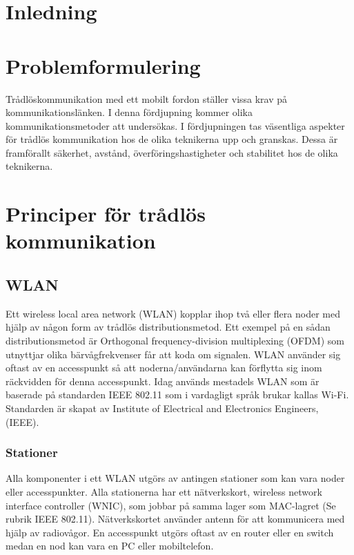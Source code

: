 \documentclass[a4paper,12pt,fleqn]{article}
\begin{document}
\addto\captionsswedish{\renewcommand{\contentsname}{Innehållsförteckning}}

\tableofcontents
\thispagestyle{fancy}
\newpage

\section{Inledning}
\section{Problemformulering}
Trådlöskommunikation med ett mobilt fordon ställer vissa krav på kommunikationslänken. I denna fördjupning kommer olika kommunikationsmetoder att undersökas. I fördjupningen tas väsentliga aspekter för trådlös kommunikation hos de olika teknikerna upp och granskas. Dessa är framförallt säkerhet, avstånd, överföringshastigheter och stabilitet hos de olika teknikerna.

\section{Principer för trådlös kommunikation}
\subsection{WLAN}
Ett wireless local area network (WLAN) kopplar ihop två eller flera noder med hjälp av någon form av trådlös distributionsmetod. Ett exempel på en sådan distributionsmetod är Orthogonal frequency-division multiplexing (OFDM) som utnyttjar olika bärvågfrekvenser får att koda om signalen. WLAN använder sig oftast av en accesspunkt så att noderna/användarna kan förflytta sig inom räckvidden för denna accesspunkt. Idag används mestadels WLAN som är baserade på standarden IEEE 802.11 som i vardagligt språk brukar kallas Wi-Fi. Standarden är skapat av Institute of Electrical and Electronics Engineers, (IEEE).

\subsubsection{Stationer}
Alla komponenter i ett WLAN utgörs av antingen stationer som kan vara noder eller accesspunkter. Alla stationerna har ett nätverkskort, wireless network interface controller (WNIC), som jobbar på samma lager som MAC-lagret (Se rubrik IEEE 802.11). Nätverkskortet använder antenn för att kommunicera med hjälp av radiovågor. En accesspunkt utgörs oftast av en router eller en switch medan en nod kan vara en PC eller mobiltelefon.
\end{document}
